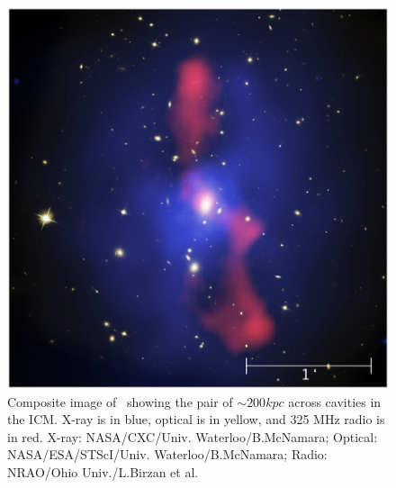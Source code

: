\documentclass[11pt]{article}
\renewenvironment{thebibliography}[1]{
  \begin{oldbib}{#1}
    \setlength{\parskip}{0pt}
    \setlength{\itemsep}{0pt}
}{\end{oldbib}}
\begin{document}




\clearpage
\begin{figure}[htp]
  \begin{center}
    \begin{minipage}{0.75\linewidth}
      \includegraphics[width=\textwidth]{ms07.ps}
    \end{minipage}
    \vspace{-2cm}
    \caption{Composite image of \ms\ showing the pair of $\sim 200
      kpc$ across cavities in the ICM. X-ray is in blue, optical is in
      yellow, and 325 MHz radio is in red. X-ray:
      NASA/CXC/Univ. Waterloo/B.McNamara; Optical:
      NASA/ESA/STScI/Univ. Waterloo/B.McNamara; Radio: NRAO/Ohio
      Univ./L.Birzan et al.}
    \label{fig:img}
  \end{center}
\end{figure}
\end{document}
